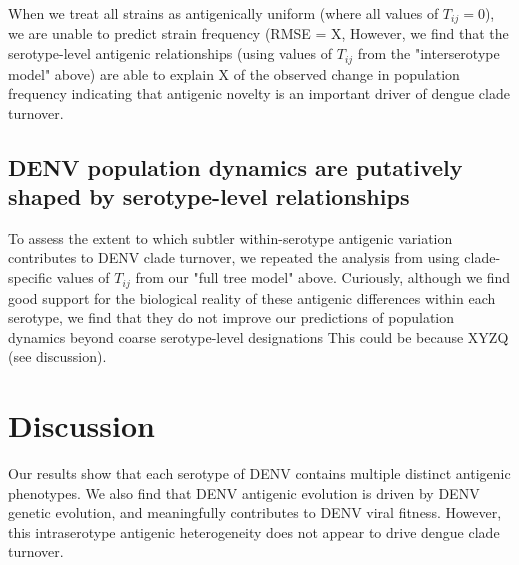 \documentclass[11pt,oneside,letterpaper]{article}
\begin{document}

When we treat all strains as antigenically uniform (where all values of $T_{ij} = 0$), we are unable to predict strain frequency (RMSE = X,
However, we find that the serotype-level antigenic relationships (using values of $T_{ij}$ from the "interserotype model" above) are able to explain X of the observed change in population frequency
indicating that antigenic novelty is an important driver of dengue clade turnover.

\subsection*{DENV population dynamics are putatively shaped by serotype-level relationships}
To assess the extent to which subtler within-serotype antigenic variation contributes to DENV clade turnover, we repeated the analysis from  using clade-specific values of $T_{ij}$ from our "full tree model" above.
Curiously, although we find good support for the biological reality of these antigenic differences within each serotype, we find that they do not improve our predictions of population dynamics beyond coarse serotype-level designations
This could be because XYZQ (see discussion).


\section*{Discussion}
Our results show that each serotype of DENV contains multiple distinct antigenic phenotypes. We also find that DENV antigenic evolution is driven by DENV genetic evolution, and meaningfully contributes to DENV viral fitness. However, this intraserotype antigenic heterogeneity does not appear to drive dengue clade turnover.
\end{document}
